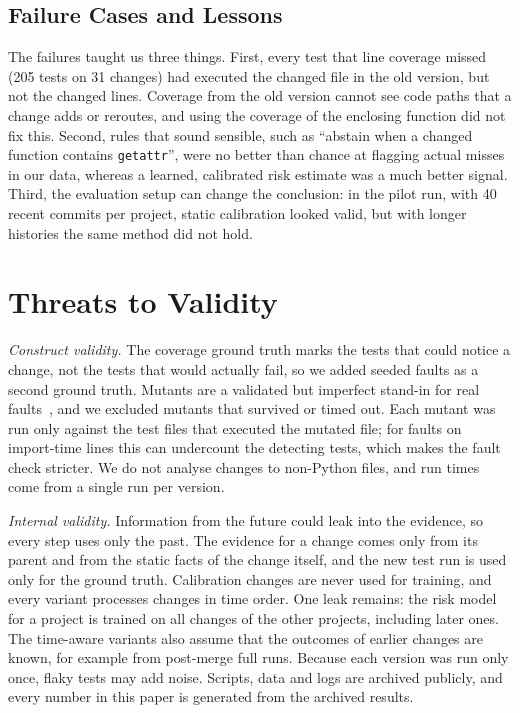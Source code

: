 \documentclass[conference]{IEEEtran}
\begin{document}
\subsection{Failure Cases and Lessons}
The failures taught us three things. First, every test that line coverage missed (205 tests on 31 changes) had executed the changed file in the old version, but not the changed lines. Coverage from the old version cannot see code paths that a change adds or reroutes, and using the coverage of the enclosing function did not fix this. Second, rules that sound sensible, such as ``abstain when a changed function contains \texttt{getattr}'', were no better than chance at flagging actual misses in our data, whereas a learned, calibrated risk estimate was a much better signal. Third, the evaluation setup can change the conclusion: in the pilot run, with 40 recent commits per project, static calibration looked valid, but with longer histories the same method did not hold.

\section{Threats to Validity}\label{sec:threats}
\textit{Construct validity.} The coverage ground truth marks the tests that could notice a change, not the tests that would actually fail, so we added seeded faults as a second ground truth. Mutants are a validated but imperfect stand-in for real faults~\cite{just2014mutants}, and we excluded mutants that survived or timed out. Each mutant was run only against the test files that executed the mutated file; for faults on import-time lines this can undercount the detecting tests, which makes the fault check stricter. We do not analyse changes to non-Python files, and run times come from a single run per version.

\textit{Internal validity.} Information from the future could leak into the evidence, so every step uses only the past. The evidence for a change comes only from its parent and from the static facts of the change itself, and the new test run is used only for the ground truth. Calibration changes are never used for training, and every variant processes changes in time order. One leak remains: the risk model for a project is trained on all changes of the other projects, including later ones. The time-aware variants also assume that the outcomes of earlier changes are known, for example from post-merge full runs. Because each version was run only once, flaky tests may add noise. Scripts, data and logs are archived publicly, and every number in this paper is generated from the archived results.
\end{document}
